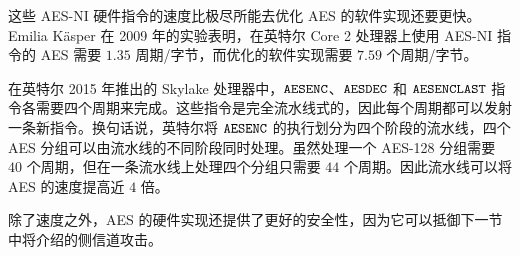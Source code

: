 这些 AES-NI 硬件指令的速度比极尽所能去优化 AES 的软件实现还要更快。Emilia Käsper 在 2009 年的实验表明，在英特尔 Core 2 处理器上使用 AES-NI 指令的 AES 需要 $1.35$ 周期/字节，而优化的软件实现需要 $7.59$ 个周期/字节。

在英特尔 2015 年推出的 Skylake 处理器中，$\tt AESENC$、$\tt AESDEC$ 和 $\tt AESENCLAST$ 指令各需要四个周期来完成。这些指令是完全流水线式的，因此每个周期都可以发射一条新指令。换句话说，英特尔将 $\tt AESENC$ 的执行划分为四个阶段的流水线，四个 AES 分组可以由流水线的不同阶段同时处理。虽然处理一个 AES-128 分组需要 $40$ 个周期，但在一条流水线上处理四个分组只需要 $44$ 个周期。因此流水线可以将 AES 的速度提高近 $4$ 倍。

除了速度之外，AES 的硬件实现还提供了更好的安全性，因为它可以抵御下一节中将介绍的侧信道攻击。




































